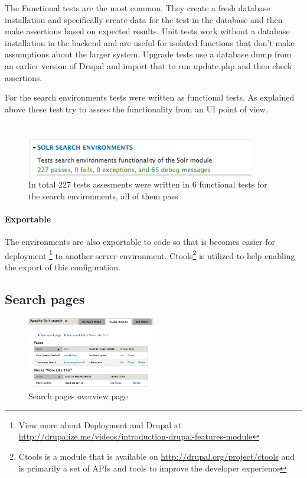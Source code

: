 The Functional tests are the most common. They create a fresh database installation and specifically create data for the test in the database and then make assertions based on expected results. Unit tests work without a database installation in the backend and are useful for isolated functions that don't make assumptions about the larger system. Upgrade tests use a database dump from an earlier version of Drupal and import that to run update.php and then check assertions.

For the search environments tests were written as functional tests. As explained above these test try to assess the functionality from an UI point of view.
\inputminted[fontsize=\scriptsize,linenos]{php}{./code_examples/testEditSearchEnvironment.php}

\inputminted[fontsize=\scriptsize,linenos]{php}{./code_examples/test_signature_search_environments.php}

\begin{figure}[H]
     \includegraphics[width=10cm]{images/implementation/test_search_environments.png}
     \caption{In total 227 tests assesments were written in 6 functional tests for the search environments, all of them pass}
\end{figure}

\paragraph{Exportable}
The environments are also exportable to code so that is becomes easier for deployment \footnote{View more about Deployment and Drupal at \url{http://drupalize.me/videos/introduction-drupal-features-module}} to another server-environment. Ctools\footnote{Ctools is a module that is available on \url{http://drupal.org/project/ctools} and is primarily a set of APIs and tools to improve the developer experience} is utilized to help enabling the export of this configuration.  

\subsection{Search pages}
\begin{figure}
\begin{center}
     \includegraphics[width=0.5\textwidth]{images/implementation/search_pages_overview.png}
     \caption{Search pages overview page}
\end{center}
\end{figure}
